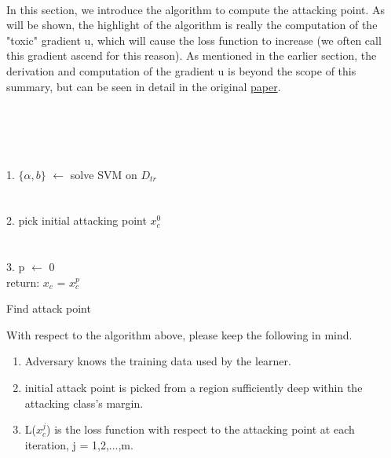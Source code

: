 \documentclass[twoside]{article}
\begin{document}
\paragraph{}
In this section, we introduce the algorithm to compute the attacking point. As will be shown, the highlight of the algorithm is really the computation of the "toxic" gradient u, which will cause the loss function to increase (we often call this gradient ascend for this reason). As mentioned in the earlier section, the derivation and computation of the gradient u is beyond the scope of this summary, but can be seen in detail in the original \textcolor{blue}{\href{https://arxiv.org/pdf/1206.6389.pdf}{paper}}.\\
\\
\begin{algorithm}[H]
\SetAlgoLined
{}
\\
\\
\\1. $\{\alpha, b\}$ $\longleftarrow$ solve SVM on $D_{tr}$\\
\\
\\2. pick initial attacking point $x_c^{0}$\\
\\
\\3. p $\longleftarrow$ 0
\\
    return: $x_c$ = $x_c^{p}$
    \caption{Find attack point}
    \end{algorithm}
With respect to the algorithm above, please keep the following in mind.
\begin{enumerate}
  \item Adversary knows the training data used by the learner.
  \item initial attack point is picked from a region sufficiently deep within the attacking class's margin.
  \item L($x_c^{j}$) is the loss function with respect to the attacking point at each iteration, j = 1,2,...,m.
\end{enumerate}
\end{document}
